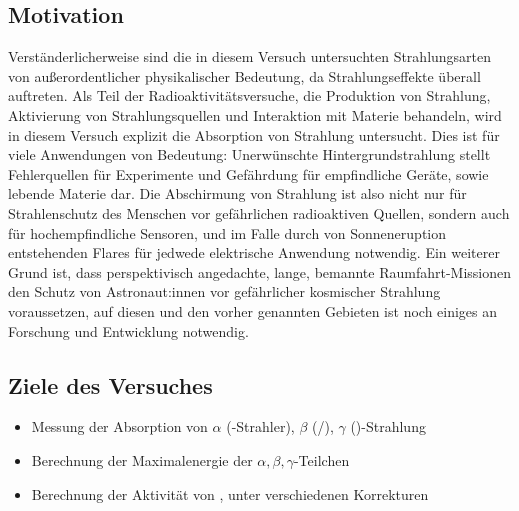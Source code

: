 \subsection{Motivation}
Verständerlicherweise sind die in diesem Versuch untersuchten Strahlungsarten von außerordentlicher physikalischer Bedeutung, da Strahlungseffekte überall auftreten. Als Teil der Radioaktivitätsversuche, die Produktion von Strahlung, Aktivierung von Strahlungsquellen und Interaktion mit Materie behandeln, wird in diesem Versuch explizit die Absorption von Strahlung untersucht. Dies ist für viele Anwendungen von Bedeutung: Unerwünschte Hintergrundstrahlung stellt Fehlerquellen für Experimente und Gefährdung für empfindliche Geräte, sowie lebende Materie dar. Die Abschirmung von Strahlung ist also nicht nur für Strahlenschutz des Menschen vor gefährlichen radioaktiven Quellen, sondern auch für hochempfindliche Sensoren, und im Falle durch von Sonneneruption entstehenden Flares für jedwede elektrische Anwendung notwendig. Ein weiterer Grund ist, dass perspektivisch angedachte, lange, bemannte Raumfahrt-Missionen den Schutz von Astronaut:innen vor gefährlicher kosmischer Strahlung voraussetzen, auf diesen und den vorher genannten Gebieten ist noch einiges an Forschung und Entwicklung notwendig.

\subsection{Ziele des Versuches}
\begin{itemize}
    \item Messung der Absorption von \(\alpha\) (-Strahler), \(\beta\) (/), \(\gamma\) ()-Strahlung
    \item Berechnung der Maximalenergie der \(\alpha,\beta,\gamma\)-Teilchen
    \item Berechnung der Aktivität von , unter verschiedenen Korrekturen
\end{itemize}

